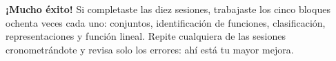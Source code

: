 \documentclass[12pt, letterpaper]{article}
\begin{document}
\vspace{10pt}
\begin{cuadroinfo}
  \small
  \textbf{¡Mucho éxito!} Si completaste las diez sesiones, trabajaste los cinco bloques ochenta veces cada uno: conjuntos, identificación de funciones, clasificación, representaciones y función lineal. Repite cualquiera de las sesiones cronometrándote y revisa solo los errores: ahí está tu mayor mejora.
\end{cuadroinfo}

\fi
\end{document}
